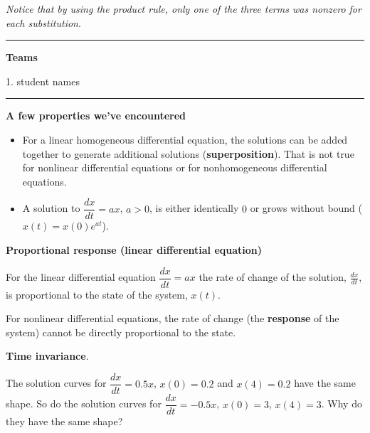 \documentclass[12pt,letterpaper,noanswers]{exam}
\begin{document}
\emph{Notice that by using the product rule, only one of the three terms was nonzero for each substitution}.



\vspace{0.2cm}
\hrule
\vspace{0.2cm}



\noindent\textbf{Teams}

\begin{multicols}{2}

1.  student names
\end{multicols}

\vspace{0.2cm}
\hrule
\vspace{0.2cm}


\noindent\textbf{A few properties we've encountered}
\begin{tcolorbox}
\begin{itemize}
\itemsep0em
\item For a linear homogeneous differential equation, the solutions can be added together to generate additional solutions (\textbf{superposition}).  That is not true for nonlinear differential equations or for nonhomogeneous differential equations.
\item A solution to $\dfrac{dx}{dt} = ax$, $a>0$, is either identically $0$ or grows without bound ($x(t) = x(0)e^{at}$).
\end{itemize}
\end{tcolorbox}

\noindent\textbf{Proportional response (linear differential equation)}

For the linear differential equation $\dfrac{dx}{dt} = ax$ the rate of change of the solution, $\frac{dx}{dt}$, is proportional to the state of the system, $x(t)$.

For nonlinear differential equations, the rate of change (the \textbf{response} of the system) cannot be directly proportional to the state.


\noindent\textbf{Time invariance}.  

The solution curves for $\dfrac{dx}{dt} = 0.5x$, $x(0) = 0.2$ and $x(4) = 0.2$ have the same shape.  So do the solution curves for $\dfrac{dx}{dt} = -0.5x$, $x(0) = 3$, $x(4) = 3$.  Why do they have the same shape?
\end{document}
